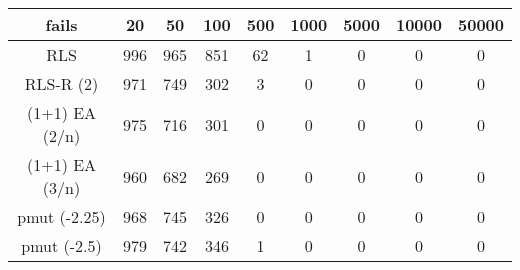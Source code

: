 \begin{tabular}[h]{ccccccccc}
fails&20&50&100&500&1000&5000&10000&50000\\\hline
RLS&996&965&851&62&1&0&0&0\\
RLS-R (2)&971&749&302&3&0&0&0&0\\
(1+1) EA (2/n)&975&716&301&0&0&0&0&0\\
(1+1) EA (3/n)&960&682&269&0&0&0&0&0\\
pmut (-2.25)&968&745&326&0&0&0&0&0\\
pmut (-2.5)&979&742&346&1&0&0&0&0\\
\end{tabular}
